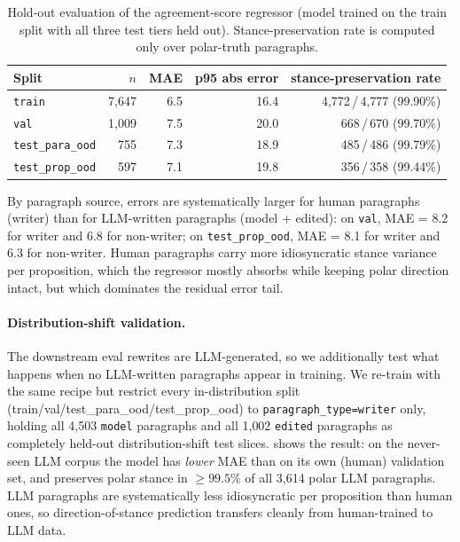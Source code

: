 \begin{table}[h]
  \centering\small
  \caption{Hold-out evaluation of the agreement-score regressor (model trained on the train split with all three test tiers held out). Stance-preservation rate is computed only over polar-truth paragraphs.}
  \label{tab:agreement-holdout}
  \begin{tabular}{lrrrr}
    \toprule
    Split & $n$ & MAE & p95 abs error & stance-preservation rate \\
    \midrule
    \texttt{train} & 7{,}647 & 6.5 & 16.4 & 4{,}772\,/\,4{,}777 (99.90\%) \\
    \texttt{val} & 1{,}009 & 7.5 & 20.0 & 668\,/\,670 (99.70\%) \\
    \texttt{test\_para\_ood} & 755 & 7.3 & 18.9 & 485\,/\,486 (99.79\%) \\
    \texttt{test\_prop\_ood} & 597 & 7.1 & 19.8 & 356\,/\,358 (99.44\%) \\
    \bottomrule
  \end{tabular}
\end{table}

By paragraph source, errors are systematically larger for human paragraphs (writer) than for LLM-written paragraphs (model + edited): on \texttt{val}, MAE = 8.2 for writer and 6.8 for non-writer; on \texttt{test\_prop\_ood}, MAE = 8.1 for writer and 6.3 for non-writer. Human paragraphs carry more idiosyncratic stance variance per proposition, which the regressor mostly absorbs while keeping polar direction intact, but which dominates the residual error tail.

\paragraph{Distribution-shift validation.}
The downstream eval rewrites are LLM-generated, so we additionally test what happens when no LLM-written paragraphs appear in training. We re-train with the same recipe but restrict every in-distribution split (train/val/test\_para\_ood/test\_prop\_ood) to \texttt{paragraph\_type=writer} only, holding all 4{,}503 \texttt{model} paragraphs and all 1{,}002 \texttt{edited} paragraphs as completely held-out distribution-shift test slices.  shows the result: on the never-seen LLM corpus the model has \emph{lower} MAE than on its own (human) validation set, and preserves polar stance in $\geq 99.5\%$ of all 3{,}614 polar LLM paragraphs. LLM paragraphs are systematically less idiosyncratic per proposition than human ones, so direction-of-stance prediction transfers cleanly from human-trained to LLM data.

